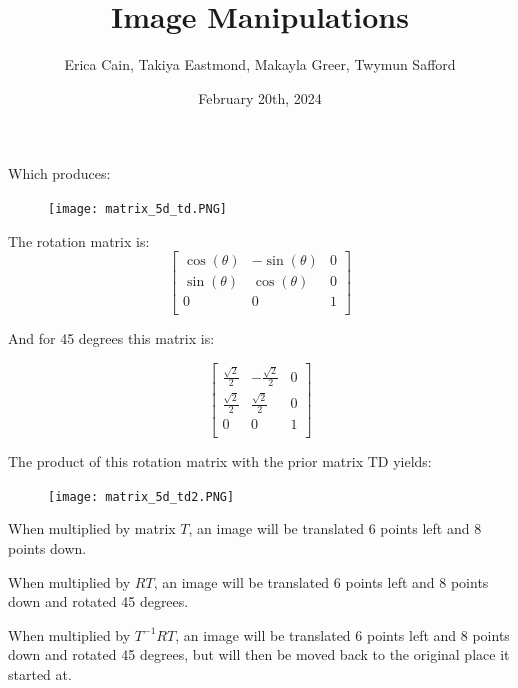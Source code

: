 \documentclass{article}
\begin{document}
Which produces:

\begin{figure}[H]
  \centering
  \texttt{[image: matrix\_5d\_td.PNG]}
  \label{fig3}
\end{figure}

The rotation matrix is: 
\[
  \begin{bmatrix}
    \cos(\theta) & -\sin(\theta) & 0 \\
    \sin(\theta) & \cos(\theta) & 0 \\
    0 & 0 & 1 \\
  \end{bmatrix}
\]

And for 45 degrees this matrix is:

\[
  \begin{bmatrix}
    \frac{\sqrt{2}}{2} & -\frac{\sqrt{2}}{2} & 0 \\
    \frac{\sqrt{2}}{2} & \frac{\sqrt{2}}{2} & 0 \\
    0 & 0 & 1 \\
  \end{bmatrix}
\]

The product of this rotation matrix with the prior matrix TD yields:

\begin{figure}[H]
  \centering
  \texttt{[image: matrix\_5d\_td2.PNG]}
  \label{fig3}
\end{figure}

When multiplied by matrix $T$, an image will be translated 6 points left and 8 points down.

When multiplied by $RT$, an image will be translated 6 points left and 8 points down and rotated 45 degrees.

When multiplied by $T^{-1}RT$, an image will be translated 6 points left and 8 points down and rotated 45 degrees, but will then be moved back to the original place it started at. 



\pagebreak

\title{Image Manipulations}
\author{Erica Cain, Takiya Eastmond, Makayla Greer, Twymun Safford}
\date{February 20th, 2024}


\begin{titlingpage}
    \begin{center}
        \vspace*{3cm}
        {\Huge \thetitle}\\[0.5cm]
        {\Large \theauthor}\\[2cm]
        {\large \thedate}
    \end{center}
\end{titlingpage}
\end{document}
